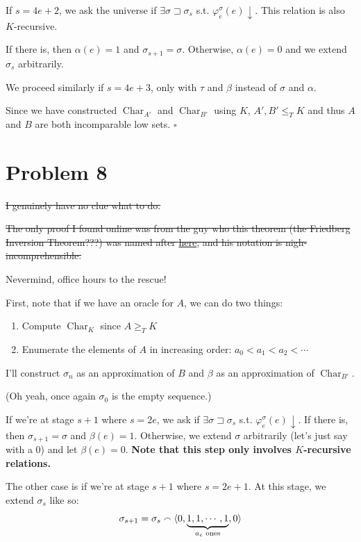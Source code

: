 \documentclass[12pt]{article}
\DeclareMathOperator{\ch}{Char}
\begin{document}
If $s=4e+2$, we ask the universe if $\exists \sigma \sqsupset \sigma_s$ s.t. $\varphi_e^\sigma(e)\downarrow$.
This relation is also $K$-recursive.

If there is, then $\alpha(e)=1$ and $\sigma_{s+1}=\sigma$.
Otherwise, $\alpha(e)=0$ and we extend $\sigma_s$ arbitrarily.

We proceed similarly if $s=4e+3$, only with $\tau$ and $\beta$ instead of $\sigma$ and $\alpha$.

Since we have constructed $\ch_{A'}$ and $\ch_{B'}$ using $K$,
$A', B' \le_T K$ and thus $A$ and $B$ are both incomparable low sets. $\square$

\pagebreak

\section{Problem 8}

\sout{I genuinely have no clue what to do.}

\sout{The only proof I found online was from the guy who this theorem
  (the Friedberg Inversion Theorem???) was named after
  \href{https://www.cambridge.org/core/services/aop-cambridge-core/content/view/BFECDB6FB6FB2AAA39F125E4F5251413/S0022481200060011a.pdf/a-criterion-for-completeness-of-degrees-of-unsolvability.pdf}{here},
  and his notation is nigh-incomprehensible.
}

Nevermind, office hours to the rescue!

First, note that if we have an oracle for $A$, we can do two things:
\begin{enumerate}[nolistsep]
  \item Compute $\ch_K$ since $A \ge_T K$
  \item Enumerate the elements of $A$ in increasing order: $a_0 < a_1 < a_2 < \cdots$
\end{enumerate}

I'll construct $\sigma_n$ as an approximation of $B$ and $\beta$ as an approximation of $\ch_{B'}$.

(Oh yeah, once again $\sigma_0$ is the empty sequence.)

If we're at stage $s+1$ where $s=2e$,
we ask if $\exists \sigma \sqsupset \sigma_s$ s.t. $\varphi_e^\sigma(e)\downarrow$.
If there is, then $\sigma_{s+1}=\sigma$ and $\beta(e)=1$.
Otherwise, we extend $\sigma$ arbitrarily (let's just say with a $0$) and let $\beta(e)=0$.
\textbf{Note that this step only involves $K$-recursive relations.}

The other case is if we're at stage $s+1$ where $s=2e+1$.
At this stage, we extend $\sigma_s$ like so:
\[\sigma_{s+1}=\sigma_s \smallfrown \braket{0, \underbrace{1, 1, \cdots, 1}_{a_e\text{ ones}}, 0}\]
\end{document}
